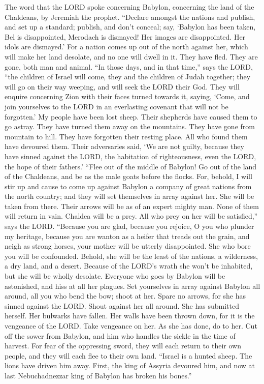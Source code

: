  The word that the LORD spoke concerning Babylon,
concerning the land of the Chaldeans, by Jeremiah the prophet.
 ``Declare amongst the nations and publish, and set up a
standard; publish, and don't conceal; say, `Babylon has been taken, Bel
is disappointed, Merodach is dismayed! Her images are disappointed. Her
idols are dismayed.'  For a nation comes up out of the
north against her, which will make her land desolate, and no one will
dwell in it. They have fled. They are gone, both man and animal.
 ``In those days, and in that time,'' says the LORD, ``the
children of Israel will come, they and the children of Judah together;
they will go on their way weeping, and will seek the LORD their God.
 They will enquire concerning Zion with their faces turned
towards it, saying, `Come, and join yourselves to the LORD in an
everlasting covenant that will not be forgotten.'  My
people have been lost sheep. Their shepherds have caused them to go
astray. They have turned them away on the mountains. They have gone from
mountain to hill. They have forgotten their resting place.
 All who found them have devoured them. Their adversaries
said, `We are not guilty, because they have sinned against the LORD, the
habitation of righteousness, even the LORD, the hope of their fathers.'
 ``Flee out of the middle of Babylon! Go out of the land
of the Chaldeans, and be as the male goats before the flocks.
 For, behold, I will stir up and cause to come up against
Babylon a company of great nations from the north country; and they will
set themselves in array against her. She will be taken from there. Their
arrows will be as of an expert mighty man. None of them will return in
vain.  Chaldea will be a prey. All who prey on her will
be satisfied,'' says the LORD.  ``Because you are glad,
because you rejoice, O you who plunder my heritage, because you are
wanton as a heifer that treads out the grain, and neigh as strong
horses,  your mother will be utterly disappointed. She
who bore you will be confounded. Behold, she will be the least of the
nations, a wilderness, a dry land, and a desert.  Because
of the LORD's wrath she won't be inhabited, but she will be wholly
desolate. Everyone who goes by Babylon will be astonished, and hiss at
all her plagues.  Set yourselves in array against Babylon
all around, all you who bend the bow; shoot at her. Spare no arrows, for
she has sinned against the LORD.  Shout against her all
around. She has submitted herself. Her bulwarks have fallen. Her walls
have been thrown down, for it is the vengeance of the LORD. Take
vengeance on her. As she has done, do to her.  Cut off
the sower from Babylon, and him who handles the sickle in the time of
harvest. For fear of the oppressing sword, they will each return to
their own people, and they will each flee to their own land.
 ``Israel is a hunted sheep. The lions have driven him
away. First, the king of Assyria devoured him, and now at last
Nebuchadnezzar king of Babylon has broken his bones.''

